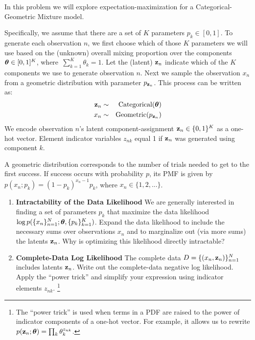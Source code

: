\documentclass[submit]{harvardml}
\begin{document}
\begin{problem}

In this problem we will explore expectation-maximization for a
Categorical-Geometric Mixture model.

Specifically, we assume that there are a set of $K$ parameters $p_k
\in [0,1]$.  To generate each observation $n$, we first choose which
of those $K$ parameters we will use based on the (unknown) overall
mixing proportion over the components $\boldsymbol{\theta} \in [0,1]^K$,
where~${\sum_{k=1}^K \theta_k=1}$.  Let the (latent) $\mathbf{z}_n$ indicate
which of the $K$ components we use to generate observation $n$.  Next
we sample the observation $x_n$ from a geometric distribution
with parameter $p_{\mathbf{z}_n}$.  This process can be written as: 
\begin{eqnarray*}
 \mathbf{z}_n &\sim& \text{Categorical}(\boldsymbol{\theta}) \\
 x_n &\sim& \text{Geometric}(p_{\mathbf{z}_n} )
\end{eqnarray*}
We encode observation $n$'s latent
component-assignment ${\mathbf{z}_n \in
  \{0,1\}^K}$ as a one-hot vector. Element indicator variables $z_{n k}$ equal 1 if $\mathbf{z}_n$ was generated using component $k$.

A geometric distribution corresponds to the number of trials
needed to get to the first success. If success occurs with probability
$p$, its PMF is given by $p(x_n ; p_k) = (1 - p_k)^{x_n - 1} p_k$, where $x_n \in \{1, 2, ...\}$.

  \begin{enumerate}

  \item \textbf{Intractability of the Data Likelihood} We are
    generally interested in finding a set of parameters $p_k$ that
    maximize the data likelihood $\log
    p(\{x_n\}^N_{n=1}; \boldsymbol{\theta}, \{p_k\}^K_{k = 1})$.  Expand the data
    likelihood to include the necessary sums over observations
    $x_n$ and to marginalize out (via more sums) the latents
    $\mathbf{z}_n$.  Why is optimizing this likelihood directly
    intractable?  

\item \textbf{Complete-Data Log Likelihood} The complete data
  $D = \{(x_n, \mathbf{z}_n)\}_{n=1}^N$ includes latents $\mathbf{z}_n$. Write
  out the complete-data negative log likelihood. Apply the ``power
  trick''  and simplify your expression using indicator elements $z_{n
    k}$. \footnote{The ``power trick'' is used when terms in a PDF are raised to the power of indicator components of a one-hot vector.  For example, it allows us to rewrite $p(\mathbf{z}_n ;  \boldsymbol{\theta}) = \prod_k \theta_k^{z_{nk}}$.}


\end{enumerate}
\end{problem}
\end{document}
